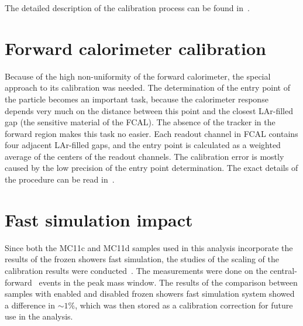 The detailed description of the calibration process can be found in~\cite{lib:calib}.

\section{Forward calorimeter calibration}
Because of the high non-uniformity of the forward calorimeter, the special approach to its calibration was needed. The determination of the entry point of the particle becomes an important task, because the calorimeter response depends very much on the distance between this point and the closest LAr-filled gap (the sensitive material of the FCAL). The absence of the tracker in the forward region makes this task no easier. Each readout channel in FCAL contains four adjacent LAr-filled gaps, and the entry point is calculated as a weighted average of the centers of the readout channels. The calibration error is mostly caused by the low precision of the entry point determination. The exact details of the procedure can be read in~\cite{lib:calib_fcal}.

\section{Fast simulation impact}

Since both the MC11c and MC11d samples used in this analysis incorporate the results of the frozen showers fast simulation, the studies of the scaling of the calibration results were conducted~\cite{lib:calib_support}. The measurements were done on the central-forward \Zee\ events in the peak mass window. The results of the comparison between samples with enabled and disabled frozen showers fast simulation system showed a difference in $\sim 1$\%, which was then stored as a calibration correction for future use in the analysis.
